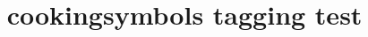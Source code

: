 \documentclass{article}
\title{cookingsymbols tagging test}
\begin{document}
\Oven
\Topbottomheat
\Topheat
\Bottomheat
\Fanoven
\Gasstove
\Dish
\Knife
\Fork
\Spoon
\Gloves
\end{document}
